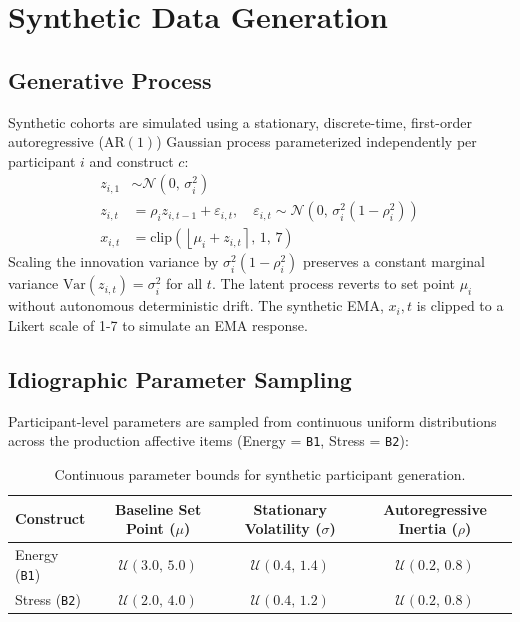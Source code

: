 \documentclass[11pt,letterpaper]{article}
\begin{document}
\section{Synthetic Data Generation}

\subsection{Generative Process}

Synthetic cohorts are simulated using a stationary, discrete-time, first-order autoregressive ($\text{AR}(1)$) Gaussian process parameterized independently per participant $i$ and construct $c$:
\begin{align}
z_{i,1} &\sim \mathcal{N}(0,\, \sigma_i^2) \\
z_{i,t} &= \rho_i z_{i,t-1} + \varepsilon_{i,t}, \quad \varepsilon_{i,t} \sim \mathcal{N}\left(0,\, \sigma_i^2(1 - \rho_i^2)\right) \\
x_{i,t} &= \text{clip}\left(\left\lfloor \mu_i + z_{i,t} \right\rceil,\, 1,\, 7\right)
\end{align}
Scaling the innovation variance by $\sigma_i^2(1 - \rho_i^2)$ preserves a constant marginal variance $\text{Var}(z_{i,t}) = \sigma_i^2$ for all $t$. The latent process reverts to set point $\mu_i$ without autonomous deterministic drift. The synthetic EMA, $x_i, t$ is clipped to a Likert scale of 1-7 to simulate an EMA response.

\subsection{Idiographic Parameter Sampling}

Participant-level parameters are sampled from continuous uniform distributions across the production affective items (Energy = \texttt{B1}, Stress = \texttt{B2}):

\begin{table}[htbp]
\centering
\small
\begin{tabular}{@{}lccc@{}}
\toprule
\textbf{Construct} & \textbf{Baseline Set Point ($\mu$)} & \textbf{Stationary Volatility ($\sigma$)} & \textbf{Autoregressive Inertia ($\rho$)} \\
\midrule
Energy (\texttt{B1}) & $\mathcal{U}(3.0,\, 5.0)$ & $\mathcal{U}(0.4,\, 1.4)$ & $\mathcal{U}(0.2,\, 0.8)$ \\
Stress (\texttt{B2}) & $\mathcal{U}(2.0,\, 4.0)$ & $\mathcal{U}(0.4,\, 1.2)$ & $\mathcal{U}(0.2,\, 0.8)$ \\
\bottomrule
\end{tabular}
\caption{Continuous parameter bounds for synthetic participant generation.}
\end{table}
\end{document}
